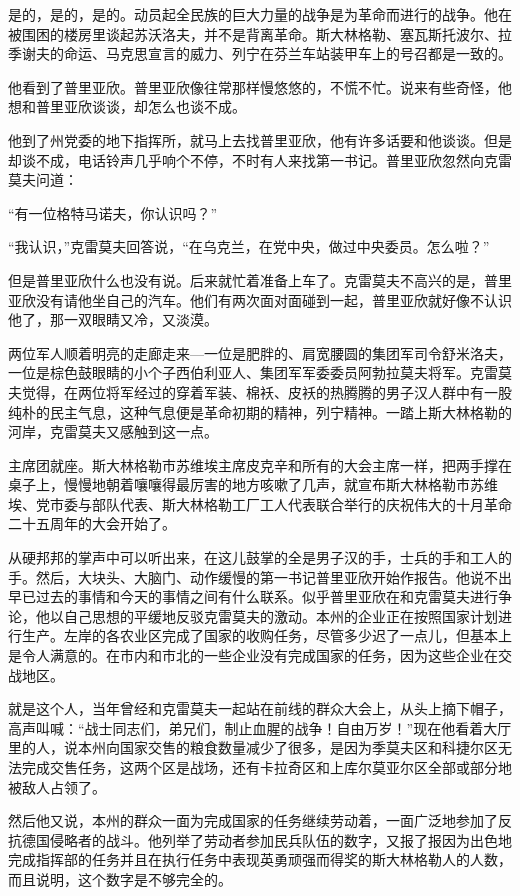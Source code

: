 是的，是的，是的。动员起全民族的巨大力量的战争是为革命而进行的战争。他在被围困的楼房里谈起苏沃洛夫，并不是背离革命。斯大林格勒、塞瓦斯托波尔、拉季谢夫的命运、马克思宣言的威力、列宁在芬兰车站装甲车上的号召都是一致的。

他看到了普里亚欣。普里亚欣像往常那样慢悠悠的，不慌不忙。说来有些奇怪，他想和普里亚欣谈谈，却怎么也谈不成。

他到了州党委的地下指挥所，就马上去找普里亚欣，他有许多话要和他谈谈。但是却谈不成，电话铃声几乎响个不停，不时有人来找第一书记。普里亚欣忽然向克雷莫夫问道：

“有一位格特马诺夫，你认识吗？”

“我认识，”克雷莫夫回答说，“在乌克兰，在党中央，做过中央委员。怎么啦？”

但是普里亚欣什么也没有说。后来就忙着准备上车了。克雷莫夫不高兴的是，普里亚欣没有请他坐自己的汽车。他们有两次面对面碰到一起，普里亚欣就好像不认识他了，那一双眼睛又冷，又淡漠。

两位军人顺着明亮的走廊走来—一位是肥胖的、肩宽腰圆的集团军司令舒米洛夫，一位是棕色鼓眼睛的小个子西伯利亚人、集团军军委委员阿勃拉莫夫将军。克雷莫夫觉得，在两位将军经过的穿着军装、棉袄、皮袄的热腾腾的男子汉人群中有一股纯朴的民主气息，这种气息便是革命初期的精神，列宁精神。一踏上斯大林格勒的河岸，克雷莫夫又感触到这一点。

主席团就座。斯大林格勒市苏维埃主席皮克辛和所有的大会主席一样，把两手撑在桌子上，慢慢地朝着嚷嚷得最厉害的地方咳嗽了几声，就宣布斯大林格勒市苏维埃、党市委与部队代表、斯大林格勒工厂工人代表联合举行的庆祝伟大的十月革命二十五周年的大会开始了。

从硬邦邦的掌声中可以听出来，在这儿鼓掌的全是男子汉的手，士兵的手和工人的手。然后，大块头、大脑门、动作缓慢的第一书记普里亚欣开始作报告。他说不出早已过去的事情和今天的事情之间有什么联系。似乎普里亚欣在和克雷莫夫进行争论，他以自己思想的平缓地反驳克雷莫夫的激动。本州的企业正在按照国家计划进行生产。左岸的各农业区完成了国家的收购任务，尽管多少迟了一点儿，但基本上是令人满意的。在市内和市北的一些企业没有完成国家的任务，因为这些企业在交战地区。

就是这个人，当年曾经和克雷莫夫一起站在前线的群众大会上，从头上摘下帽子，高声叫喊：“战士同志们，弟兄们，制止血腥的战争！自由万岁！”现在他看着大厅里的人，说本州向国家交售的粮食数量减少了很多，是因为季莫夫区和科捷尔区无法完成交售任务，这两个区是战场，还有卡拉奇区和上库尔莫亚尔区全部或部分地被敌人占领了。

然后他又说，本州的群众一面为完成国家的任务继续劳动着，一面广泛地参加了反抗德国侵略者的战斗。他列举了劳动者参加民兵队伍的数字，又报了报因为出色地完成指挥部的任务并且在执行任务中表现英勇顽强而得奖的斯大林格勒人的人数，而且说明，这个数字是不够完全的。

